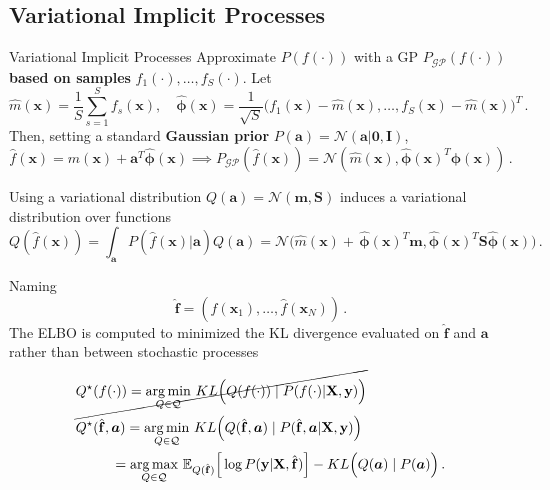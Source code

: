     \subsection{Variational Implicit Processes}
    \begin{frame}{Variational Implicit Processes}
        Approximate \(P(f(\cdot))\) with a GP \(P_{\mathcal{GP}}(f(\cdot))\) \textbf{based on samples} \(f_1(\cdot),\dots,f_S(\cdot)\).
        Let
        \[
            \hat{m}(\mathbf x) = \frac{1}{S}\sum_{s=1}^S f_s(\mathbf x), \quad            \hat{\mathbf \phi}(\mathbf x) = \frac{1}{\sqrt{S}}  \Big(f_1(\mathbf x) - \hat{m}(\mathbf x), \ldots, f_S(\mathbf x) - \hat{m}(\mathbf x)\Big)^T\,.
        \]
        Then, setting a standard \textbf{Gaussian prior} \(P(\mathbf a) = \mathcal{N}(\mathbf a | \mathbf 0, \mathbf I)\),
        \[
            \hat{f}(\mathbf x) = \hat{m}(\mathbf x) + \mathbf a^T \hat{\mathbf \phi}(\mathbf x) \implies P_{\mathcal{GP}}(\hat{f}(\mathbf x)) = \mathcal{N}(\hat{m}(\mathbf x), \hat{\mathbf \phi}(\mathbf x)^T\hat{\mathbf \phi}(\mathbf x))\,.
        \]

        Using a variational distribution \(Q(\mathbf a) = \mathcal{N}(\mathbf m, \mathbf S)\) induces a variational distribution over functions
        \[
            Q(\hat{f}(\mathbf x)) = \int_{\bm a}P(\hat{f}(\mathbf x) | \bm a)Q(\bm a) = \mathcal{N}\Big(\hat{m}(\mathbf x) + \,\hat{\mathbf \phi}(\mathbf x)^T\mathbf m, \hat{\mathbf \phi}(\mathbf x)^T\mathbf S\hat{\mathbf \phi}(\mathbf x)\Big)\,.
        \]

    \end{frame}
    \begin{frame}
        Naming
        \[
        \hat{\mathbf{f}} = (\hat{f}(\mathbf x_1),\dots, \hat{f}(\mathbf x_N))\,.
        \]
        The ELBO is computed to minimized the KL divergence evaluated on \(\hat{\mathbf{f}}\) and \(\bm a\) rather than between stochastic processes
        \[
        \begin{aligned}
            &\cancel{Q^\star(f(\cdot)) = \operatorname*{arg\,min}_{Q \in \mathcal{Q}}\, KL\Big(Q(f(\cdot))  \mid P( f(\cdot) | \mathbf X, \mathbf y)\Big)}\\
            &Q^\star (\hat{\mathbf{f}}, \bm a) = \operatorname*{arg\,min}_{Q \in \mathcal{Q}}\, KL\Big(Q(\hat{\mathbf{f}}, \bm a)  \mid P( \hat{\mathbf{f}}, \bm a | \mathbf X, \mathbf y)\Big)\\
            &\hspace{0.9cm} = \operatorname*{arg\,max}_{Q \in \mathcal{Q}} \,\mathbb{E}_{Q(\hat{\mathbf{f}})}\Big[ \log P(\mathbf y | \mathbf X, \hat{\mathbf{f}}) \Big] - KL\Big(Q(\bm a) \mid P(\bm a) \Big)\,.
        \end{aligned}
        \]

    \end{frame}
    
